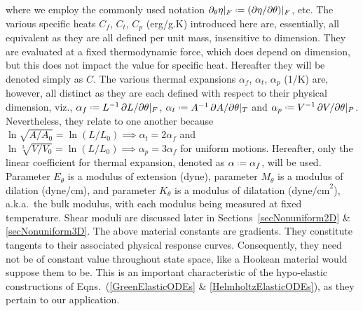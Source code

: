 where we employ the commonly used notation $\partial_{\theta} \eta |_F \defeq ( \partial \eta / \partial \theta ) |_F$, etc.  The various specific heats $C_f$, $C_t$, $C_p$ (erg/g.K) introduced here are, essentially, all equivalent as they are all defined per unit mass, insensitive to dimension.  They are evaluated at a fixed thermo\-dynamic force, which does depend on dimension, but this does not impact the value for specific heat.  Hereafter they will be denoted simply as $C$.  The various thermal expansions $\alpha_f$, $\alpha_t$, $\alpha_p$ (1/K) are, however, all distinct as they are each defined with respect to their physical dimension, viz., $\alpha_f \defeq L^{-1} \, \partial L / \partial \theta |_F$, $\alpha_t \defeq A^{-1} \, \partial A / \partial \theta |_T$ and $\alpha_p \defeq V^{-1} \, \partial V / \partial \theta |_P$.  Nevertheless, they relate to one another because $\ln \sqrt{A / \! A_0} = \ln (L / L_0) \implies \alpha_t = 2 \alpha_f$ and $\ln \sqrt[3]{V \! / V_0} = \ln (L / L_0) \implies \alpha_p = 3 \alpha_f$ for uniform motions.  Hereafter, only the linear coefficient for thermal expansion, denoted as $\alpha \defeq \alpha_f$, will be used.  Parameter $E_{\theta}$ is a modulus of extension (dyne), parameter $M_{\theta}$ is a modulus of dilation (dyne/cm), and parameter $K_{\theta}$ is a modulus of dilatation ($\mathrm{dyne/cm}^2$), a.k.a.\ the bulk modulus, with each modulus being measured at fixed temperature.  Shear moduli are discussed later in Sections~\ref{secNonuniform2D} \& \ref{secNonuniform3D}.  The above material constants are gradients.  They constitute tangents to their associated physical response curves.  Consequently, they need not be of constant value throughout state space, like a Hookean material would suppose them to be.  This is an important characteristic of the hypo-elastic constructions of Eqns.~(\ref{GreenElasticODEs} \& \ref{HelmholtzElasticODEs}), as they pertain to our application. 

